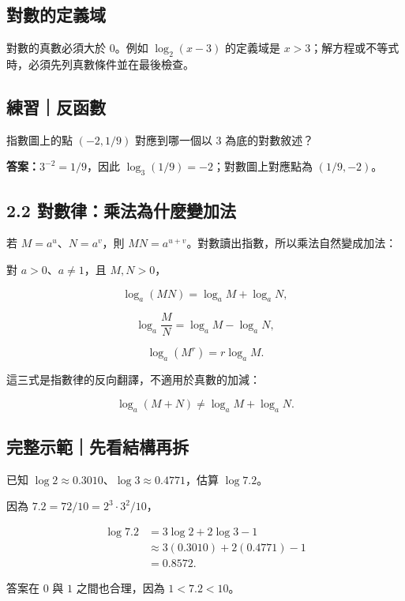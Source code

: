 \documentclass[11pt,a4paper]{article}
\begin{document}
\subsection{對數的定義域}\label{ux5c0dux6578ux7684ux5b9aux7fa9ux57df}

對數的真數必須大於 \(0\)。例如 \(\log_2(x-3)\) 的定義域是 \(x>3\)；解方程或不等式時，必須先列真數條件並在最後檢查。

\begin{HandoutSelfCheck}

\subsection{練習｜反函數}\label{ux7df4ux7fd2ux53cdux51fdux6578}

指數圖上的點 \((-2,1/9)\) 對應到哪一個以 \(3\) 為底的對數敘述？

\textbf{答案：}\(3^{-2}=1/9\)，因此 \(\log_3(1/9)=-2\)；對數圖上對應點為 \((1/9,-2)\)。

\end{HandoutSelfCheck}

\subsection{2.2 對數律：乘法為什麼變加法}\label{ux5c0dux6578ux5f8bux4e58ux6cd5ux70baux4ec0ux9ebcux8b8aux52a0ux6cd5}

若 \(M=a^u\)、\(N=a^v\)，則 \(MN=a^{u+v}\)。對數讀出指數，所以乘法自然變成加法：

對 \(a>0\)、\(a\ne1\)，且 \(M,N>0\)，

\[
\boxed{\log_a(MN)=\log_aM+\log_aN},
\]

\[
\boxed{\log_a\frac MN=\log_aM-\log_aN},
\]

\[
\boxed{\log_a(M^r)=r\log_aM}.
\]

這三式是指數律的反向翻譯，不適用於真數的加減：

\[
\log_a(M+N)\ne\log_aM+\log_aN.
\]

\begin{HandoutWorkedExample}

\subsection{完整示範｜先看結構再拆}\label{ux5b8cux6574ux793aux7bc4ux5148ux770bux7d50ux69cbux518dux62c6}

已知 \(\log2\approx0.3010\)、\(\log3\approx0.4771\)，估算 \(\log7.2\)。

因為 \(7.2=72/10=2^3\cdot3^2/10\)，

\[
\begin{aligned}
\log7.2
&=3\log2+2\log3-1\\
&\approx3(0.3010)+2(0.4771)-1\\
&=\boxed{0.8572}.
\end{aligned}
\]

答案在 \(0\) 與 \(1\) 之間也合理，因為 \(1<7.2<10\)。

\end{HandoutWorkedExample}
\end{document}
